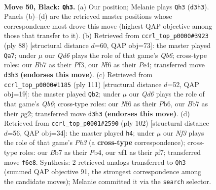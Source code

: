 \documentclass[11pt]{article}
\begin{document}
\clearpage

\begin{figure}[p]\centering
\begin{subfigure}{0.46\textwidth}\centering
\resizebox{\linewidth}{!}{%
\newchessgame
\chessboard[
  setfen={8/1b3pk1/5np1/8/7P/3q4/3RR2P/5NK1 b - - 8 50},
  showmover=false,
  pgfstyle=straightmove, color=movearrow, markmove={d3-h3}
]}
\caption{}
\end{subfigure}\hfill
\begin{subfigure}{0.46\textwidth}\centering
\resizebox{\linewidth}{!}{%
\newchessgame
\chessboard[
  setfen={8/5ppk/1Q5p/1rr5/4P2P/5PPK/8/8 w - - 1 45},
  showmover=false,
  pgfstyle=straightmove, color=movearrow, markmove={b6-a7}
]}
\caption{}
\end{subfigure}
\\[4pt]
\begin{subfigure}{0.46\textwidth}\centering
\resizebox{\linewidth}{!}{%
\newchessgame
\chessboard[
  setfen={8/8/1p1R4/6kp/6p1/1q1R4/6PP/7K b - - 5 56},
  showmover=false,
  pgfstyle=straightmove, color=movearrow, markmove={b3-b2}
]}
\caption{}
\end{subfigure}\hfill
\begin{subfigure}{0.46\textwidth}\centering
\resizebox{\linewidth}{!}{%
\newchessgame
\chessboard[
  setfen={4k3/1r3p2/Q3p3/1r6/1P6/7P/6PK/8 w - - 1 52},
  showmover=false,
  pgfstyle=straightmove, color=movearrow, markmove={h3-h4}
]}
\caption{}
\end{subfigure}
\caption{\textbf{Move 50, Black: \texttt{Qh3}.} (a) Our position; Melanie plays \texttt{Qh3} (\texttt{d3h3}). Panels (b)--(d) are the retrieved master positions whose correspondence most drove this move (highest QAP objective among those that transfer to it). (b) Retrieved from \texttt{ccrl\_top\_p0000\#3923} (ply 88) [structural distance $d$=60, QAP obj=73]: the master played \texttt{Qa7}; under $\mu$ our \emph{Qd6} plays the role of that game's \emph{Qb6}; cross-type roles: our \emph{B}b7 as their \emph{P}f3, our \emph{N}f6 as their \emph{P}e4; transferred move \texttt{d3h3} \textbf{(endorses this move)}. (c) Retrieved from \texttt{ccrl\_top\_p0000\#1185} (ply 111) [structural distance $d$=52, QAP obj=19]: the master played \texttt{Qb2}; under $\mu$ our \emph{Qd6} plays the role of that game's \emph{Qb6}; cross-type roles: our \emph{N}f6 as their \emph{P}b6, our \emph{B}b7 as their \emph{p}g2; transferred move \texttt{d3h3} \textbf{(endorses this move)}. (d) Retrieved from \texttt{ccrl\_top\_p0001\#2590} (ply 102) [structural distance $d$=56, QAP obj=34]: the master played \texttt{h4}; under $\mu$ our \emph{Nf3} plays the role of that game's \emph{Ph3} (a \textbf{cross-type} correspondence); cross-type roles: our \emph{B}b7 as their \emph{P}b4, our \emph{n}f1 as their \emph{p}f7; transferred move \texttt{f6e8}. Synthesis: 2 retrieved analogs transferred to \texttt{Qh3} (summed QAP objective 91, the strongest correspondence among the candidate moves); Melanie committed it via the \texttt{search} selector.}
\label{fig:thought-m99}
\end{figure}
\end{document}
